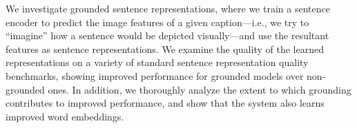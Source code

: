We investigate grounded sentence representations, where we train a sentence encoder to predict the image features of a given caption---i.e., we try to ``imagine'' how a sentence would be depicted visually---and use the resultant features as sentence representations. We examine the quality of the learned representations on a variety of standard sentence representation quality benchmarks, showing improved performance for grounded models over non-grounded ones. In addition, we thoroughly analyze the extent to which grounding contributes to improved performance, and show that the system also learns improved word embeddings.

